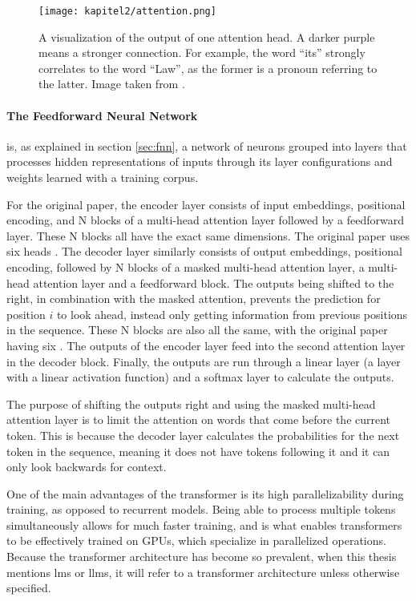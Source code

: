 \begin{figure}
    \centering
    \texttt{[image: kapitel2/attention.png]}
    \caption{A visualization of the output of one attention head. A darker purple means a stronger connection. For example, the word \enquote{its} strongly correlates to the word \enquote{Law}, as the former is a pronoun referring to the latter. Image taken from \cite{Vaswani.2017}.}
    \label{fig:attention}
\end{figure}

\paragraph{The Feedforward Neural Network} is, as explained in section \ref{sec:fnn}, a network of neurons grouped into layers that processes hidden representations of inputs through its layer configurations and weights learned with a training corpus.
\newline

For the original paper, the encoder layer consists of input embeddings, positional encoding, and N blocks of a multi-head attention layer followed by a feedforward layer.
These N blocks all have the exact same dimensions.
The original paper uses six heads \cite{Vaswani.2017}.
The decoder layer similarly consists of output embeddings, positional encoding, followed by N blocks of a masked multi-head attention layer, a multi-head attention layer and a feedforward block.
The outputs being shifted to the right, in combination with the masked attention, prevents the prediction for position $i$ to look ahead, instead only getting information from previous positions in the sequence.
These N blocks are also all the same, with the original paper having six \cite{Vaswani.2017}.
The outputs of the encoder layer feed into the second attention layer in the decoder block.
Finally, the outputs are run through a linear layer (a layer with a linear activation function) and a softmax layer to calculate the outputs.

The purpose of shifting the outputs right and using the masked multi-head attention layer is to limit the attention on words that come before the current token.
This is because the decoder layer calculates the probabilities for the next token in the sequence, meaning it does not have tokens following it and it can only look backwards for context.

One of the main advantages of the transformer is its high parallelizability during training, as opposed to recurrent models.
Being able to process multiple tokens simultaneously allows for much faster training, and is what enables transformers to be effectively trained on GPUs, which specialize in parallelized operations.
Because the transformer architecture has become so prevalent, when this thesis mentions \acp{lm} or \acp{llm}, it will refer to a transformer architecture unless otherwise specified.

